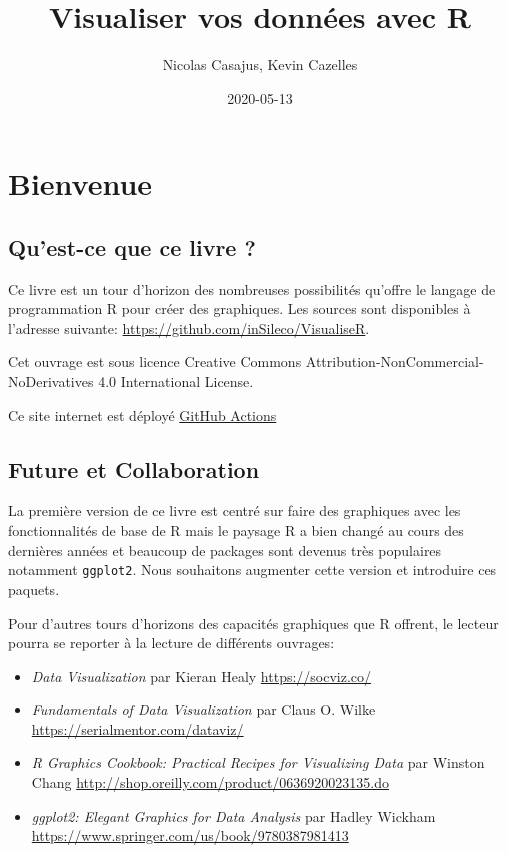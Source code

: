 \documentclass[]{article}
\title{Visualiser vos données avec R}
\author{Nicolas Casajus, Kevin Cazelles}
\date{2020-05-13}
\providecommand{\tightlist}{%
  \setlength{\itemsep}{0pt}\setlength{\parskip}{0pt}}
\begin{document}
\maketitle

{
\setcounter{tocdepth}{2}
\tableofcontents
}
\hypertarget{bienvenue}{%
\section*{Bienvenue}\label{bienvenue}}

\hypertarget{quest-ce-que-ce-livre}{%
\subsection*{Qu'est-ce que ce livre ?}\label{quest-ce-que-ce-livre}}

Ce livre est un tour d'horizon des nombreuses possibilités qu'offre le
langage de programmation R pour créer des graphiques. Les sources sont
disponibles à l'adresse suivante: \url{https://github.com/inSileco/VisualiseR}.

Cet ouvrage est sous licence
Creative Commons Attribution-NonCommercial-NoDerivatives 4.0 International License.

Ce site internet est déployé \href{https://github.com/features/actions}{GitHub
Actions}

\hypertarget{future-et-collaboration}{%
\subsection*{Future et Collaboration}\label{future-et-collaboration}}

La première version de ce livre est centré sur faire des graphiques avec les
fonctionnalités de base de R mais le paysage R a bien changé au cours des
dernières années et beaucoup de packages sont devenus très populaires notamment
\texttt{ggplot2}. Nous souhaitons augmenter cette version et introduire ces paquets.

Pour d'autres tours d'horizons des capacités graphiques que R offrent,
le lecteur pourra se reporter à la lecture de différents ouvrages:

\begin{itemize}
\tightlist
\item
  \emph{Data Visualization} par Kieran Healy \url{https://socviz.co/}
\item
  \emph{Fundamentals of Data Visualization} par Claus O. Wilke \url{https://serialmentor.com/dataviz/}
\item
  \emph{R Graphics Cookbook: Practical Recipes for Visualizing Data} par Winston Chang \url{http://shop.oreilly.com/product/0636920023135.do}
\item
  \emph{ggplot2: Elegant Graphics for Data Analysis} par Hadley Wickham
  \url{https://www.springer.com/us/book/9780387981413}
\end{itemize}
\end{document}
